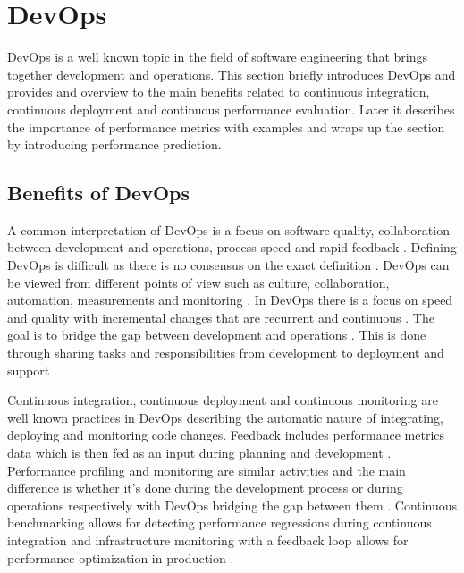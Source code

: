 \section{DevOps} %
\label{sec:devops}

DevOps is a well known topic in the field of software engineering that brings together development and operations. This section briefly introduces DevOps and provides and overview to the main benefits related to continuous integration, continuous deployment and continuous performance evaluation. Later it describes the importance of performance metrics with examples and wraps up the section by introducing performance prediction.

\subsection{Benefits of DevOps}

A common interpretation of DevOps is a focus on software quality, collaboration between development and operations, process speed and rapid feedback \parencite{mishraDevOpsSoftwareQuality2020,wallerIncludingPerformanceBenchmarks2015, pereraImproveSoftwareQuality2017}. Defining DevOps is difficult as there is no consensus on the exact definition \parencite{smedsDevOpsDefinitionPerceived2015,mishraDevOpsSoftwareQuality2020}. DevOps can be viewed from different points of view such as culture, collaboration, automation, measurements and monitoring \parencite{mishraDevOpsSoftwareQuality2020, wallerIncludingPerformanceBenchmarks2015}. In DevOps there is a focus on speed and quality with incremental changes that are recurrent and continuous \parencite{mishraDevOpsSoftwareQuality2020}. The goal is to bridge the gap between development and operations \parencite{smedsDevOpsDefinitionPerceived2015}. This is done through sharing tasks and responsibilities from development to deployment and support \parencite{mishraDevOpsSoftwareQuality2020}.

Continuous integration, continuous deployment and continuous monitoring are well known practices in DevOps \parencite{wallerIncludingPerformanceBenchmarks2015} describing the automatic nature of integrating, deploying and monitoring code changes. Feedback includes performance metrics data which is then fed as an input during planning and development \parencite{smedsDevOpsDefinitionPerceived2015}. Performance profiling and monitoring are similar activities and the main difference is whether it's done during the development process or during operations respectively \parencite{wallerIncludingPerformanceBenchmarks2015} with DevOps bridging the gap between them \parencite{brunnertPerformanceorientedDevOpsResearch2015}. Continuous benchmarking allows for detecting performance regressions during continuous integration \parencite{wallerIncludingPerformanceBenchmarks2015} and infrastructure monitoring with a feedback loop allows for performance optimization in production \parencite{smedsDevOpsDefinitionPerceived2015}.


